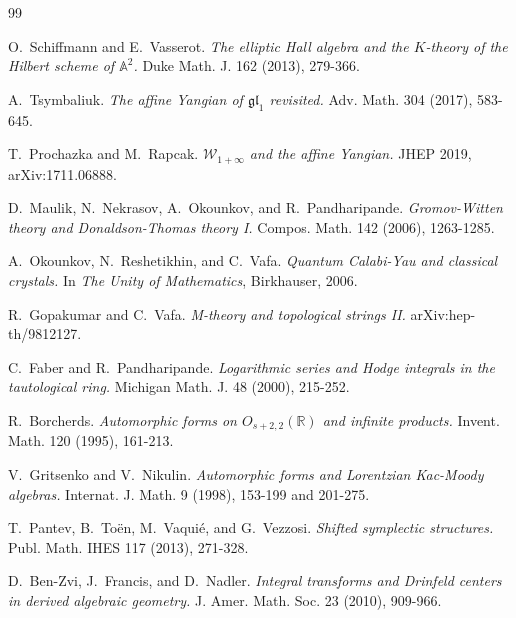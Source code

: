 \documentclass[11pt]{article}
\theoremstyle{definition}
\theoremstyle{remark}
\begin{document}
\begin{thebibliography}{99}

O.~Schiffmann and E.~Vasserot.
\emph{The elliptic Hall algebra and the $K$-theory of the Hilbert
scheme of $\mathbb{A}^2$.}
Duke Math. J. 162 (2013), 279-366.

A.~Tsymbaliuk.
\emph{The affine Yangian of $\mathfrak{gl}_1$ revisited.}
Adv. Math. 304 (2017), 583-645.

T.~Prochazka and M.~Rapcak.
\emph{$\mathcal{W}_{1+\infty}$ and the affine Yangian.}
JHEP 2019, arXiv:1711.06888.

D.~Maulik, N.~Nekrasov, A.~Okounkov, and R.~Pandharipande.
\emph{Gromov-Witten theory and Donaldson-Thomas theory I.}
Compos. Math. 142 (2006), 1263-1285.

A.~Okounkov, N.~Reshetikhin, and C.~Vafa.
\emph{Quantum Calabi-Yau and classical crystals.}
In \emph{The Unity of Mathematics}, Birkhauser, 2006.

R.~Gopakumar and C.~Vafa.
\emph{M-theory and topological strings II.}
arXiv:hep-th/9812127.

C.~Faber and R.~Pandharipande.
\emph{Logarithmic series and Hodge integrals in the tautological ring.}
Michigan Math. J. 48 (2000), 215-252.

R.~Borcherds.
\emph{Automorphic forms on $O_{s+2,2}(\mathbb{R})$ and infinite
products.}
Invent. Math. 120 (1995), 161-213.

V.~Gritsenko and V.~Nikulin.
\emph{Automorphic forms and Lorentzian Kac-Moody algebras.}
Internat. J. Math. 9 (1998), 153-199 and 201-275.

T.~Pantev, B.~To\"en, M.~Vaqui\'e, and G.~Vezzosi.
\emph{Shifted symplectic structures.}
Publ. Math. IHES 117 (2013), 271-328.

D.~Ben-Zvi, J.~Francis, and D.~Nadler.
\emph{Integral transforms and Drinfeld centers in derived algebraic
geometry.}
J. Amer. Math. Soc. 23 (2010), 909-966.

\end{thebibliography}
\end{document}
